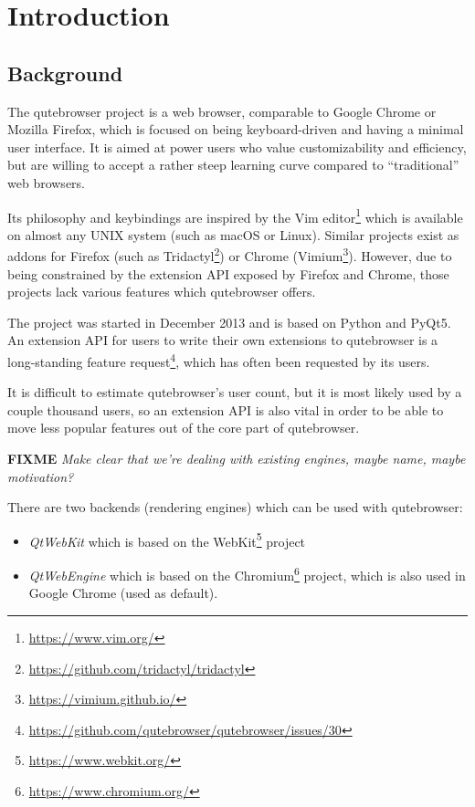 \documentclass[a4paper,parskip=full,DIV=14,BCOR=15mm]{scrreprt}
\newcommand{\fixme}[1]{\textbf{FIXME} \emph{#1}}
\begin{document}
\chapter{Introduction}
\label{ch:intro}

\section{Background}

The qutebrowser project is a web browser, comparable to Google Chrome or Mozilla
Firefox, which is focused on being keyboard-driven and having a minimal user
interface. It is aimed at power users who value customizability and efficiency,
but are willing to accept a rather steep learning curve compared to
``traditional'' web browsers.

Its philosophy and keybindings are inspired by the Vim
editor\footnote{\url{https://www.vim.org/}} which is available on almost any
UNIX system (such as macOS or Linux). Similar projects exist as addons for
Firefox (such as Tridactyl\footnote{\url{https://github.com/tridactyl/tridactyl}})
or Chrome (Vimium\footnote{\url{https://vimium.github.io/}}). However, due to
being constrained by the extension API exposed by Firefox and Chrome, those
projects lack various features which qutebrowser offers.

The project was started in December 2013 and is based on Python and PyQt5. An
extension API for users to write their own extensions to qutebrowser is a
long-standing feature
request\footnote{\url{https://github.com/qutebrowser/qutebrowser/issues/30}},
which has often been requested by its users.

It is difficult to estimate qutebrowser's user count, but it is most likely used by a
couple thousand users, so an extension API is also vital in order to be able to move
less popular features out of the core part of qutebrowser.

\fixme{Make clear that we're dealing with existing engines, maybe name, maybe motivation?}

\label{backends}
There are two backends (rendering engines) which can be used with qutebrowser:

\begin{itemize}
  \item \emph{QtWebKit} which is based on the
  WebKit\footnote{\url{https://www.webkit.org/}} project
  \item \emph{QtWebEngine} which is based on the
  Chromium\footnote{\url{https://www.chromium.org/}} project, which is also used
  in Google Chrome (used as default).
\end{itemize}
\end{document}
